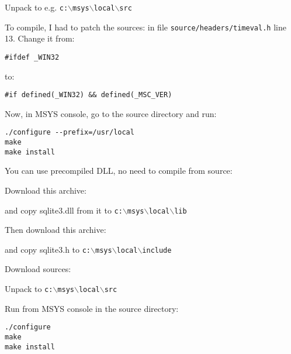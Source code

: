 Unpack to e.g. \texttt{c:$\backslash$msys$\backslash$local$\backslash$src}

To compile, I had to patch the sources: in file \texttt{source/headers/timeval.h} line 13.
Change it from:

\begin{verbatim}
#ifdef _WIN32
\end{verbatim}
to:

\begin{verbatim}
#if defined(_WIN32) && defined(_MSC_VER)
\end{verbatim}

Now, in MSYS console, go to the source directory and run:

\begin{verbatim}
./configure --prefix=/usr/local
make
make install
\end{verbatim}

You can use precompiled DLL, no need to compile from source:

Download this archive:

	\begin{quotation}
	\end{quotation}

and copy sqlite3.dll from it to \texttt{c:$\backslash$msys$\backslash$local$\backslash$lib}

Then download this archive:

	\begin{quotation}
	\end{quotation}

and copy sqlite3.h to \texttt{c:$\backslash$msys$\backslash$local$\backslash$include}

Download sources:

	\begin{quotation}
	\end{quotation}

Unpack to \texttt{c:$\backslash$msys$\backslash$local$\backslash$src}

Run from MSYS console in the source directory:

\begin{verbatim}
./configure
make
make install
\end{verbatim}

